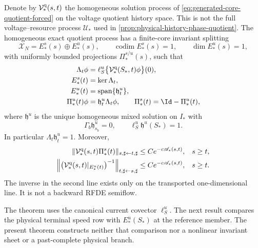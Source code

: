 \begin{theorem}
Denote by \(\mathcal V_*^{\rm q}(s,t)\) the homogeneous solution process
of \cref{eq:generated-core-quotient-forced} on the voltage quotient
history space.  This is not the full voltage--resource process
\(\mathcal U_*\) used in
\cref{prop:physical-history-phase-quotient}.  The homogeneous exact
quotient process has a finite-core
invariant splitting
\begin{equation}
 \mathscr X_N=E_*^s(s)\oplus E_*^u(s),\qquad
 \operatorname{codim}E_*^s(s)=1,\qquad
 \dim E_*^u(s)=1,                                \label{eq:generated-core-normal-splitting}
\end{equation}
with uniformly bounded projections
\(\Pi_*^{s/u}(s)\), such that
\begin{align}
 \Lambda_t\phi
 &=\ell_S^u
   \bigl\{\mathcal V_*^{\rm q}(S_*,t)\phi\bigr\}(0),\notag\\
 E_*^s(t)&=\ker\Lambda_t,\notag\\
 E_*^u(t)&=\operatorname{span}\{\mathfrak h_t^u\},          \label{eq:generated-core-bundle-definitions}\\
 \Pi_*^u(t)\phi&=\mathfrak h_t^u\Lambda_t\phi,
 \qquad
 \Pi_*^s(t)=\Id-\Pi_*^u(t),                    \label{eq:generated-core-bundle-projections}
\end{align}
where \(\mathfrak h^u\) is the unique homogeneous mixed solution on
\(I_*\) with
\[
 \Gamma_b\mathfrak h_{s_b}^u=0,\qquad
 \ell_S^u\mathfrak h^u(S_*)=1.
\]
In particular \(\Lambda_t\mathfrak h_t^u=1\).  Moreover,
\begin{align}
 \|\mathcal V_*^{\rm q}(s,t)\Pi_*^s(t)\|_
   {s,\sharp\leftarrow t,\sharp}
 &\le Ce^{-c\mathscr A_*(s,t)},&&s\ge t,\notag\\
 \left\|
 \bigl(\mathcal V_*^{\rm q}(s,t)|_{E_*^u(t)}\bigr)^{-1}
 \right\|_{t,\sharp\leftarrow s,\sharp}
 &\le Ce^{-c\mathscr A_*(s,t)},&&s\ge t.         \label{eq:generated-core-dichotomy-bounds}
\end{align}
The inverse in the second line exists only on the transported
one-dimensional line.  It is not a backward RFDE semiflow.

The theorem uses the canonical current covector \(\ell_S^u\).  The next
result compares the physical terminal speed row with \(E_*^u(S_*)\) at the
reference member.  The present theorem constructs neither that comparison
nor a nonlinear invariant sheet or a past-complete physical branch.
\end{theorem}

